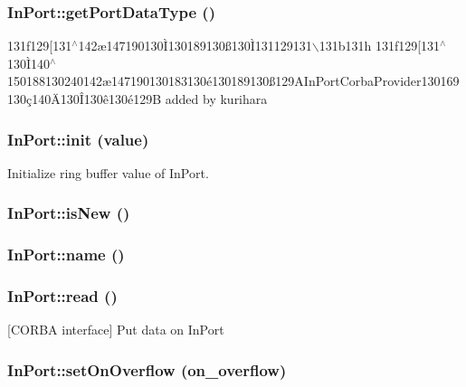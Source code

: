 \subsubsection{\setlength{\rightskip}{0pt plus 5cm}In\-Port::get\-Port\-Data\-Type ()}\label{classInPort_InPorta14}


131f129[131$^\wedge$142\ae{}147190130\`{I}130189130\ss{}130\`{I}131129131$\backslash$131b131h 131f129[131$^\wedge$130\`{I}140$^\wedge$150188130240142\ae{}147190130183130\'{e}130189130\ss{}129AIn\-Port\-Corba\-Provider130169130\c{c}140\"{A}130\^{I}130\^{e}130\'{e}129B added by kurihara 

\subsubsection{\setlength{\rightskip}{0pt plus 5cm}In\-Port::init (value)}\label{classInPort_InPorta6}


Initialize ring buffer value of In\-Port. 

\subsubsection{\setlength{\rightskip}{0pt plus 5cm}In\-Port::is\-New ()}\label{classInPort_InPorta2}


\subsubsection{\setlength{\rightskip}{0pt plus 5cm}In\-Port::name ()}\label{classInPort_InPorta3}


\subsubsection{\setlength{\rightskip}{0pt plus 5cm}In\-Port::read ()}\label{classInPort_InPorta5}


[CORBA interface] Put data on In\-Port 

\subsubsection{\setlength{\rightskip}{0pt plus 5cm}In\-Port::set\-On\-Overflow (on\_\-overflow)}\label{classInPort_InPorta12}


